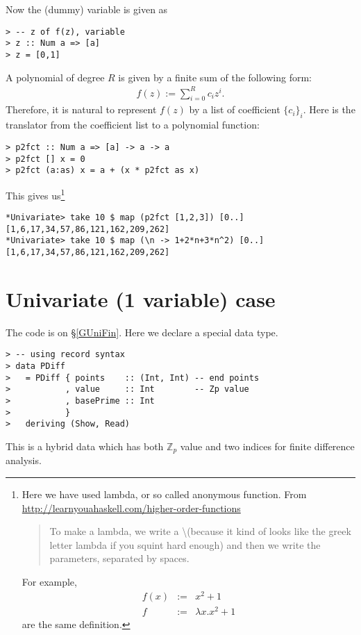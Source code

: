 \documentclass[11pt]{book}
\begin{document}
Now the (dummy) variable is given as 
\begin{verbatim}
> -- z of f(z), variable
> z :: Num a => [a]
> z = [0,1]
\end{verbatim}

A polynomial of degree $R$ is given by a finite sum of the following form:
\begin{eqnarray}
f(z) := \sum_{i=0}^R c_i z^i.
\end{eqnarray}
Therefore, it is natural to represent $f(z)$ by a list of coefficient $\{c_i\}_i$.
Here is the translator from the coefficient list to a polynomial function:
\begin{verbatim}
> p2fct :: Num a => [a] -> a -> a
> p2fct [] x = 0
> p2fct (a:as) x = a + (x * p2fct as x)
\end{verbatim}
This gives us\footnote{
Here we have used lambda, or so called anonymous function.
From\\
\url{http://learnyouahaskell.com/higher-order-functions}
\begin{quote}
To make a lambda, we write a \textbackslash (because it kind of looks like the greek letter lambda if you squint hard enough) and then we write the parameters, separated by spaces. 
\end{quote}
For example,
\begin{eqnarray}
f(x) &:=& x^2 + 1 \\
f &:=& \lambda x. x^2+1
\end{eqnarray}
are the same definition.
}
\begin{verbatim}
*Univariate> take 10 $ map (p2fct [1,2,3]) [0..]
[1,6,17,34,57,86,121,162,209,262]
*Univariate> take 10 $ map (\n -> 1+2*n+3*n^2) [0..]
[1,6,17,34,57,86,121,162,209,262]
\end{verbatim}

\section{Univariate (1 variable) case}
The code is on \S\ref{GUniFin}.
Here we declare a special data type.
\begin{verbatim}
> -- using record syntax
> data PDiff 
>   = PDiff { points    :: (Int, Int) -- end points
>           , value     :: Int        -- Zp value
>           , basePrime :: Int
>           }
>   deriving (Show, Read)
\end{verbatim}
This is a hybrid data which has both $\mathbb{Z}_p$ value and two indices for finite difference analysis.
\end{document}
